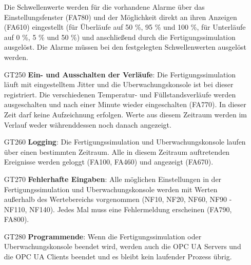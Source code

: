 \documentclass[parskip=full]{scrartcl}
\begin{document}
\begin{enumerate}
   Die Schwellenwerte werden für die vorhandene Alarme über das Einstellungsfenster (FA780) und der Möglichkeit direkt an ihren Anzeigen (FA610) eingestellt (für Überläufe auf 50 \%, 95 \% und 100 \%, für Unterläufe auf 0 \%, 5 \% und 50 \%) und anschließend durch die \gls{Fertigungssimulation} ausgelöst. Die Alarme müssen bei den festgelegten Schwellenwerten ausgelöst werden.
  \item[GT250] \textbf{Ein- und Ausschalten der Verläufe}: Die \gls{Fertigungssimulation} läuft mit eingestelltem \gls{Jitter} und die \gls{Uberwachungskonsole} ist bei dieser registriert.
   Die verschiedenen Temperatur- und Füllstandsverläufe werden ausgeschalten und nach einer Minute wieder eingeschalten (FA770). In dieser Zeit darf keine Aufzeichnung erfolgen.
   Werte aus diesem Zeitraum werden im Verlauf weder währenddessen noch danach angezeigt.
  \item[GT260] \textbf{Logging}: Die \gls{Fertigungssimulation} und \gls{Uberwachungskonsole} laufen über einen bestimmten Zeitraum. Alle in diesem Zeitraum auftretenden Ereignisse werden geloggt (FA100, FA460) und angezeigt (FA670).
  \item[GT270] \textbf{Fehlerhafte Eingaben}: Alle möglichen Einstellungen in der \gls{Fertigungssimulation} und \gls{Uberwachungskonsole} werden mit Werten außerhalb des Wertebereichs vorgenommen (NF10, NF20, NF60, NF90 - NF110, NF140).
   Jedes Mal muss eine Fehlermeldung erscheinen (FA790, FA800).
  \item[GT280] \textbf{Programmende}: Wenn die \gls{Fertigungssimulation} oder \gls{Uberwachungskonsole} beendet wird, werden auch die \glspl{OPC UA Server} und die \glspl{OPC UA Client} beendet und es bleibt kein
   laufender Prozess übrig.
\end{enumerate}
\end{document}
